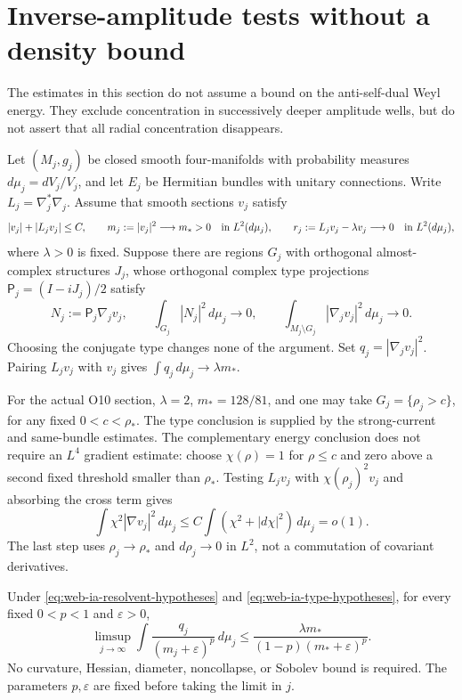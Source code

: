 \section{Inverse-amplitude tests without a density bound}
\label{sec:web-inverse-amplitude}

The estimates in this section do not assume a bound on the anti-self-dual
Weyl energy.  They exclude concentration in successively deeper amplitude
wells, but do not assert that all radial concentration disappears.

Let \((M_j,g_j)\) be closed smooth four-manifolds with probability measures
\(d\mu_j=dV_j/V_j\), and let \(E_j\) be Hermitian bundles with unitary
connections.  Write \(L_j=\nabla_j^*\nabla_j\).  Assume that smooth
sections \(v_j\) satisfy
\begin{equation}
 |v_j|+|L_jv_j|\le C,\qquad
 m_j:=|v_j|^2\longrightarrow m_*>0\quad\hbox{in }L^2(d\mu_j),
 \qquad
 r_j:=L_jv_j-\lambda v_j\longrightarrow0\quad\hbox{in }L^2(d\mu_j),
 \label{eq:web-ia-resolvent-hypotheses}
\end{equation}
where \(\lambda>0\) is fixed.  Suppose there are regions \(G_j\) with
orthogonal almost-complex structures \(J_j\), whose orthogonal complex
type projections \(\mathsf P_j=(I-iJ_j)/2\) satisfy
\begin{equation}
 N_j:=\mathsf P_j\nabla_jv_j,
 \qquad \int_{G_j}|N_j|^2\,d\mu_j\longrightarrow0,
 \qquad
 \int_{M_j\setminus G_j}|\nabla_jv_j|^2\,d\mu_j\longrightarrow0.
 \label{eq:web-ia-type-hypotheses}
\end{equation}
Choosing the conjugate type changes none of the argument.
Set \(q_j=|\nabla_jv_j|^2\).  Pairing \(L_jv_j\) with \(v_j\) gives
\(\int q_j\,d\mu_j\to\lambda m_*\).

For the actual O10 section, \(\lambda=2\), \(m_*=128/81\), and one
may take \(G_j=\{\rho_j>c\}\), for any fixed \(0<c<\rho_*\).
The type conclusion is supplied by the strong-current and same-bundle
estimates.  The complementary energy conclusion does not require an
\(L^4\) gradient estimate: choose \(\chi(\rho)=1\) for \(\rho\le c\)
and zero above a second fixed threshold smaller than \(\rho_*\).
Testing \(L_jv_j\) with \(\chi(\rho_j)^2v_j\) and absorbing the cross
term gives
\[
 \int\chi^2|\nabla v_j|^2\,d\mu_j
       \le C\int(\chi^2+|d\chi|^2)\,d\mu_j=o(1).
\]
The last step uses \(\rho_j\to\rho_*\) and \(d\rho_j\to0\) in
\(L^2\), not a commutation of covariant derivatives.

\begin{proposition}
\label{prop:web-ia-moment}
Under \eqref{eq:web-ia-resolvent-hypotheses} and
\eqref{eq:web-ia-type-hypotheses}, for every fixed \(0<p<1\) and
\(\varepsilon>0\),
\begin{equation}
 \limsup_{j\to\infty}\int
       \frac{q_j}{(m_j+\varepsilon)^p}\,d\mu_j
       \le\frac{\lambda m_*}{(1-p)(m_*+\varepsilon)^p}.
 \label{eq:web-ia-moment}
\end{equation}
No curvature, Hessian, diameter, noncollapse, or Sobolev bound is required.
The parameters \(p,\varepsilon\) are fixed before taking the limit in \(j\).
\end{proposition}

